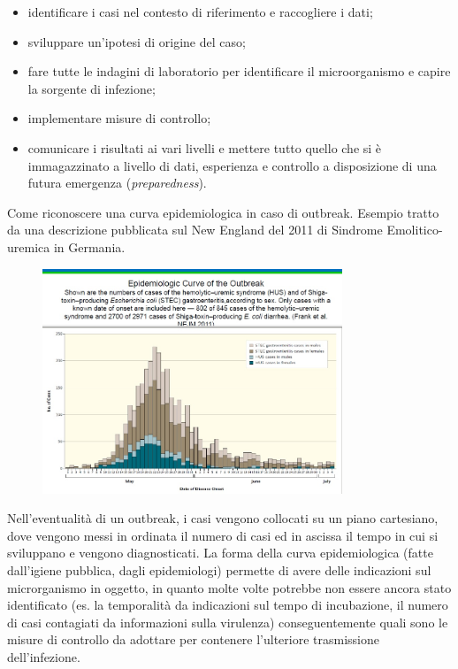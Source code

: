 \begin{itemize}
\item
  identificare i casi nel contesto di riferimento e raccogliere i dati;
\item
  sviluppare un'ipotesi di origine del caso;
\item
  fare tutte le indagini di laboratorio per identificare il
  microorganismo e capire la sorgente di infezione;
\item
  implementare misure di controllo;
\item
  comunicare i risultati ai vari livelli e mettere tutto quello che si è
  immagazzinato a livello di dati, esperienza e controllo a disposizione
  di una futura emergenza (\emph{preparedness}).
\end{itemize}

Come riconoscere una curva epidemiologica in caso di outbreak. Esempio
tratto da una descrizione pubblicata sul New England del 2011 di
Sindrome Emolitico-uremica in Germania.

\begin{figure}[!ht]
\centering
	\includegraphics[width=0.8\textwidth]{26/image9.jpeg}
	\end{figure}

Nell'eventualità di un outbreak, i casi vengono collocati su un piano
cartesiano, dove vengono messi in ordinata il numero di casi ed in
ascissa il tempo in cui si sviluppano e vengono diagnosticati. La forma
della curva epidemiologica (fatte dall'igiene pubblica, dagli
epidemiologi) permette di avere delle indicazioni sul microrganismo in
oggetto, in quanto molte volte potrebbe non essere ancora stato
identificato (es. la temporalità da indicazioni sul tempo di
incubazione, il numero di casi contagiati da informazioni sulla
virulenza) conseguentemente quali sono le misure di controllo da
adottare per contenere l'ulteriore trasmissione dell'infezione.

